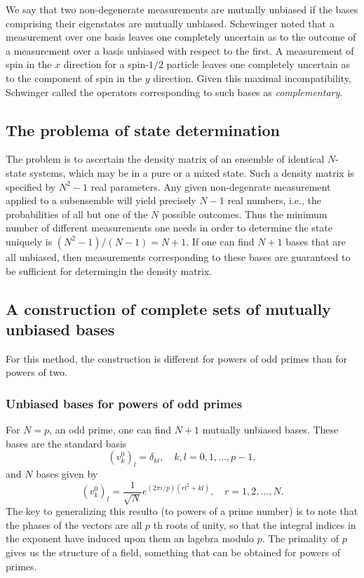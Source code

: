\documentclass[a4paper]{article}
\begin{document}
  We say that two non-degenerate measurements are mutually
  unbiased if the bases comprising their eigenstates are
  mutually unbiased. Schewinger noted that a measurement
  over one basis leaves one completely uncertain as to the
  outcome of a measurement over a basis unbiased with
  respect to the first. A measurement of spin in the $x$ 
  direction for a spin-$1 / 2$ particle leaves one
  completely uncertain as to the component of spin in the
  $y$ direction. Given this maximal incompatibility,
  Schwinger called the operators corresponding to such bases
  as \textit{complementary}.

  \subsection{The problema of state determination}

  The problem is to ascertain the density matrix of an
  ensemble of identical $N$-state systems, which may be in a
  pure or a mixed state. Such a density matrix is specified
  by $N^2-1$ real parameters. Any given non-degenrate
  measurement applied to a subensemble will yield precisely
  $N-1$ real numbers, i.e., the probabilities of all but one
  of the $N$ possible outcomes. Thus the minimum number of
  different measurements one needs in order to determine the
  state uniquely is $(N^2-1) / (N-1) = N + 1$. If one can
  find $N+1$ bases that are all unbiased, then measurements
  corresponding to these bases are guaranteed to be
  sufficient for determingin the density matrix.

  \subsection{A construction of complete sets of mutually
  unbiased bases}

  For this method, the construction is different for powers
  of odd primes than for powers of two.

  \subsubsection{Unbiased bases for powers of odd primes}

  For $N = p$, an odd prime, one can find $N+1$ mutually
  unbiased bases. These bases are the standard basis
  \[
    (v_k^0)_l = \delta_{kl},
    \quad k,l = 0,1,\ldots,p-1,
  \] 
  and $N$ bases given by
  \[
    (v_k^0)_l = \frac{1}{\sqrt{N}} e^{(2\pi i /
    p)(rl^2+kl)},
    \quad r = 1,2,\ldots,N.
  \] 
  The key to generalizing this resulto (to powers of a prime
  number) is to note that the phases of the vectors are all
  $p$ th roots of unity, so that the integral indices in the
  exponent have induced upon them an lagebra modulo $p$. The
  primality of $p$ gives us the structure of a field,
  something that can be obtained for powers of primes.
\end{document}
